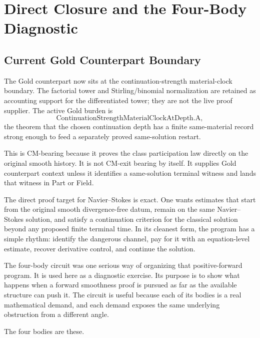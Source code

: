 \section{Direct Closure and the Four-Body Diagnostic}
\label{sec:positive-forward-four-body-diagnostic}

\subsection{Current Gold Counterpart Boundary}
\label{subsec:current-gold-counterpart-boundary}

The Gold counterpart now sits at the continuation-strength material-clock
boundary.  The factorial tower and Stirling/binomial normalization are retained
as accounting support for the differentiated tower; they are not the live proof
supplier.  The active Gold burden is
\[
  \mathrm{ContinuationStrengthMaterialClockAtDepth.A},
\]
the theorem that the chosen continuation depth has a finite same-material
record strong enough to feed a separately proved same-solution restart.

This is CM-bearing because it proves the class participation law directly on
the original smooth history.  It is not CM-exit bearing by itself.  It supplies
Gold counterpart context unless it identifies a same-solution terminal witness
and lands that witness in Part or Field.

The direct proof target for Navier--Stokes is exact. One wants estimates that
start from the original smooth divergence-free datum, remain on the same
Navier--Stokes solution, and satisfy a continuation criterion for the classical
solution beyond any proposed finite terminal time. In its cleanest form, the
program has a simple rhythm: identify the dangerous channel, pay for it with an
equation-level estimate, recover derivative control, and continue the solution.

The four-body circuit was one serious way of organizing that positive-forward
program. It is used here as a diagnostic exercise. Its purpose is to show
what happens when a forward smoothness proof is pursued as far as the available
structure can push it. The circuit is useful because each of its bodies is a real
mathematical demand, and each demand exposes the same underlying obstruction
from a different angle.

The four bodies are these.

